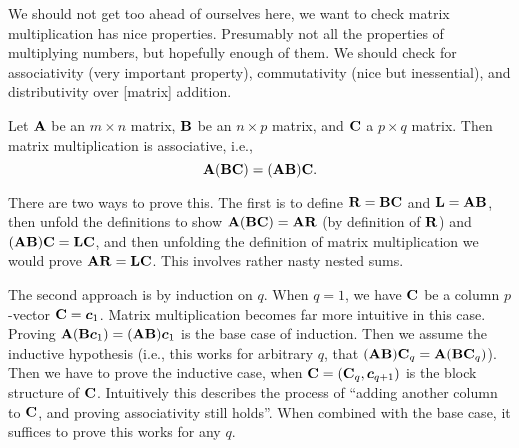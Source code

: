 We should not get too ahead of ourselves here, we want to check matrix
multiplication has nice properties. Presumably not all the properties of
multiplying numbers, but hopefully enough of them. We should check for
associativity (very important property), commutativity (nice but
inessential), and distributivity over [matrix] addition.

\begin{theorem}[Associativity]
Let $\mathbf{A}$ be an $m\times n$ matrix, $\mathbf{B}$ be an $n\times p$
matrix, and $\mathbf{C}$ a $p\times q$ matrix.
Then matrix multiplication is associative, i.e.,
\begin{equation}
\mathbf{A}(\mathbf{B}\mathbf{C}) = (\mathbf{A}\mathbf{B})\mathbf{C}.
\end{equation}
\end{theorem}

There are two ways to prove this. The first is to define
$\mathbf{R}=\mathbf{B}\mathbf{C}$ and $\mathbf{L}=\mathbf{A}\mathbf{B}$, then unfold the
definitions to show $\mathbf{A}(\mathbf{B}\mathbf{C})=\mathbf{A}\mathbf{R}$ (by
definition of $\mathbf{R}$) and $(\mathbf{A}\mathbf{B})\mathbf{C}=\mathbf{L}\mathbf{C}$,
and then unfolding the definition of matrix multiplication we would
prove $\mathbf{A}\mathbf{R}=\mathbf{L}\mathbf{C}$. This involves rather nasty nested
sums.

The second approach is by induction on $q$. When $q=1$, we have
$\mathbf{C}$ be a column $p$-vector $\mathbf{C}=\boldsymbol{c}_{1}$. Matrix
multiplication becomes far more intuitive in this case. Proving
$\mathbf{A}(\mathbf{B}\boldsymbol{c}_{1})=(\mathbf{A}\mathbf{B})\boldsymbol{c}_{1}$ is the base
case of induction. Then we assume the inductive hypothesis (i.e., this
works for arbitrary $q$, that
$(\mathbf{A}\mathbf{B})\mathbf{C}_{q}=\mathbf{A}(\mathbf{B}\mathbf{C}_{q})$). Then we have
to prove the inductive case, when $\mathbf{C}=(\mathbf{C}_{q},\boldsymbol{c}_{q+1})$
is the block structure of $\mathbf{C}$. Intuitively this describes the
process of ``adding another column to $\mathbf{C}$, and proving
associativity still holds''. When combined with the base case, it
suffices to prove this works for any $q$.

